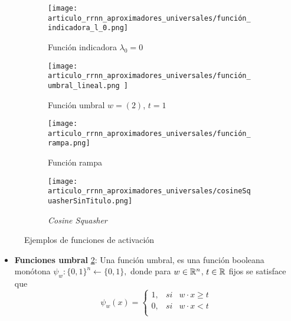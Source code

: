 \begin{definicion}
    \begin{figure}[h]
        \centering
        \begin{subfigure}[t]{0.47\textwidth}
            \centering
            \texttt{[image: 
                articulo\_rrnn\_aproximadores\_universales/función\_indicadora\_l\_0.png]}
            \caption{Función indicadora $\lambda_0 = 0$}  
            \label{fig:función_indicadora}
        \end{subfigure}
        \hfill
        \begin{subfigure}[t]{0.47\textwidth}  
            \centering 
            \texttt{[image: articulo\_rrnn\_aproximadores\_universales/función\_umbral\_lineal.png
            ]}
            \caption{Función umbral $w=(2)$, $t=1$}    
            \label{fig:función_umbral_lineal}
        \end{subfigure}
        \begin{subfigure}[t]{0.47\textwidth}   
            \centering 
            \texttt{[image: articulo\_rrnn\_aproximadores\_universales/función\_rampa.png]}
            \caption{Función rampa} 
            \label{fig:funciones_rampa}
        \end{subfigure}
        \hfill
        \begin{subfigure}[t]{0.47\textwidth}   
            \centering 
            \texttt{[image: articulo\_rrnn\_aproximadores\_universales/cosineSquasherSinTitulo.png]}
            \caption{\textit{Cosine Squasher}}   
            \label{fig:cosine_squasher}
        \end{subfigure}
        \caption{Ejemplos de funciones de activación} 
        \label{fig:EjemplosFunciónActivación}
    \end{figure}

    \begin{itemize}
        \item \textbf{Funciones umbral} \ref{fig:función_umbral_lineal}:
        Una función umbral, es una función booleana monótona $\psi_w: \{0,1\}^n \longleftarrow \{0,1\},$ 
        donde para $w \in \mathbb{R}^n$, $t \in \mathbb{R}$ fijos se
        satisface que 
        \begin{equation}
            \psi_w(x) = \left\{
                \begin{array}{lcc}
                    1, &   si  & w \cdot x \geq t \\
                    0, &  si & w \cdot x < t\\
                    \end{array}
            \right.
        \end{equation}
        

\end{itemize}
\end{definicion}
